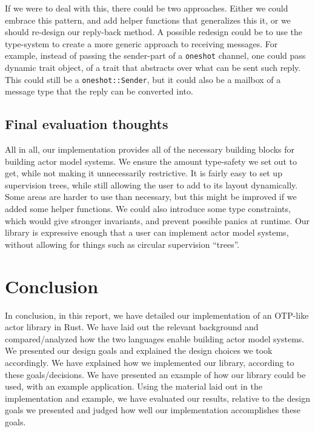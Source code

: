 \documentclass[a4paper]{article}
\begin{document}
\noindent
If we were to deal with this, there could be two approaches. Either we could
embrace this pattern, and add helper functions that generalizes this it, or
we should re-design our reply-back method. A possible redesign could be to use
the type-system to create a more generic approach to receiving messages. For
example, instead of passing the sender-part of a \texttt{oneshot} channel,
one could pass dynamic trait object, of a trait that abstracts over what can be
sent such reply. This could still be a \texttt{oneshot::Sender}, but it could
also be a mailbox of a message type that the reply can be converted into.

\subsection{Final evaluation thoughts}
All in all, our implementation provides all of the necessary building blocks for
building actor model systems. We ensure the amount type-safety we set out to
get, while not making it unnecessarily restrictive. It is fairly easy to set up
supervision trees, while still allowing the user to add to its layout
dynamically. Some areas are harder to use than necessary, but this
might be improved if we added some helper functions. We could also introduce
some type constraints, which would give stronger invariants, and prevent
possible panics at runtime. Our library is expressive enough that a user can
implement actor model systems, without allowing for things such as circular
supervision ``trees''.

\section{Conclusion}
In conclusion, in this report, we have detailed our implementation of an OTP-like
actor library in Rust. We have laid out the relevant background and
compared/analyzed how the two languages enable building actor model systems. We presented
our design goals and explained the design choices we took accordingly. We have
explained how we implemented our library, according to these goals/decisions. We
have presented an example of how our library could be used, with an example
application. Using the material laid out in the implementation and example, we
have evaluated our results, relative to the design goals we presented and
judged how well our implementation accomplishes these goals.

\newpage


\end{document}
